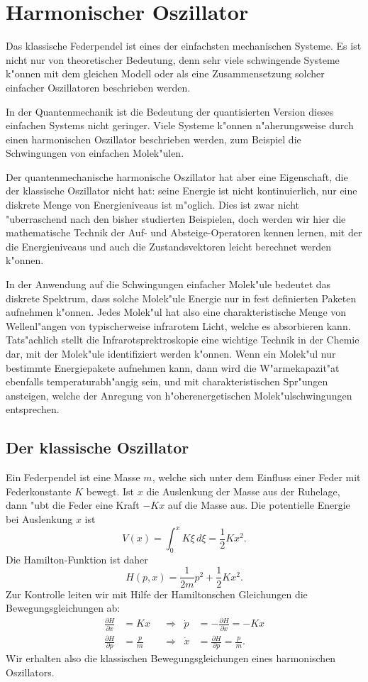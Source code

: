 \chapter{Harmonischer Oszillator\label{chapter:harmonischeroszillator}}
\rhead{}
Das klassische Federpendel ist eines der einfachsten mechanischen 
Systeme. Es ist nicht nur von theoretischer Bedeutung, denn sehr
viele schwingende Systeme k"onnen mit dem gleichen Modell
oder als eine Zusammensetzung solcher einfacher Oszillatoren
beschrieben werden.

In der Quantenmechanik ist die Bedeutung der quantisierten Version
dieses einfachen Systems nicht geringer. Viele Systeme k"onnen
n"aherungsweise durch einen harmonischen Oszillator beschrieben
werden, zum Beispiel die Schwingungen von einfachen Molek"ulen.

Der quantenmechanische harmonische Oszillator hat aber eine Eigenschaft,
die der klassische Oszillator nicht hat: seine Energie ist nicht
kontinuierlich, nur eine diskrete Menge von Energieniveaus ist
m"oglich. Dies ist zwar nicht "uberraschend nach den bisher studierten
Beispielen, doch werden wir hier die mathematische Technik  der
Auf- und Absteige-Operatoren kennen lernen, mit der die Energieniveaus
und auch die Zustandsvektoren leicht berechnet werden k"onnen.

In der Anwendung auf die Schwingungen einfacher Molek"ule
bedeutet das diskrete Spektrum, dass solche Molek"ule Energie nur in
fest definierten Paketen aufnehmen k"onnen.
Jedes Molek"ul hat also eine charakteristische Menge von Wellenl"angen
von typischerweise infrarotem Licht, welche es absorbieren kann.
Tats"achlich stellt die Infrarotsprektroskopie eine wichtige
Technik in der Chemie dar, mit der Molek"ule identifiziert werden k"onnen.
Wenn ein Molek"ul nur bestimmte Energiepakete aufnehmen kann, dann
wird die W"armekapazit"at ebenfalls temperaturabh"angig sein, und
mit charakteristischen Spr"ungen ansteigen, welche der Anregung
von h"oherenergetischen Molek"ulschwingungen entsprechen.

\section{Der klassische Oszillator}
Ein Federpendel ist eine Masse $m$, welche sich unter dem Einfluss
einer Feder mit Federkonstante $K$ bewegt. Ist $x$ die Auslenkung
der Masse aus der Ruhelage, dann "ubt die Feder eine Kraft $-Kx$ 
auf die Masse aus. Die potentielle Energie bei Auslenkung $x$ ist
\[
V(x)=\int_0^xK\xi\,d\xi=\frac12Kx^2.
\]
Die Hamilton-Funktion ist daher
\[
H(p,x)=\frac1{2m}p^2+\frac12Kx^2.
\]
Zur Kontrolle leiten wir mit Hilfe der Hamiltonschen Gleichungen
die Bewegungsgleichungen ab:
\begin{align*}
\frac{\partial H}{\partial x}&=Kx
&
&\Rightarrow&
\dot p&=-\frac{\partial H}{\partial x}=-Kx
\\
\frac{\partial H}{\partial p}&=\frac{p}{m}
&
&\Rightarrow&
\dot x&=\frac{\partial H}{\partial p}=\frac{p}{m}.
\end{align*}
Wir erhalten also die klassischen  Bewegungsgleichungen eines harmonischen
Oszillators. 

